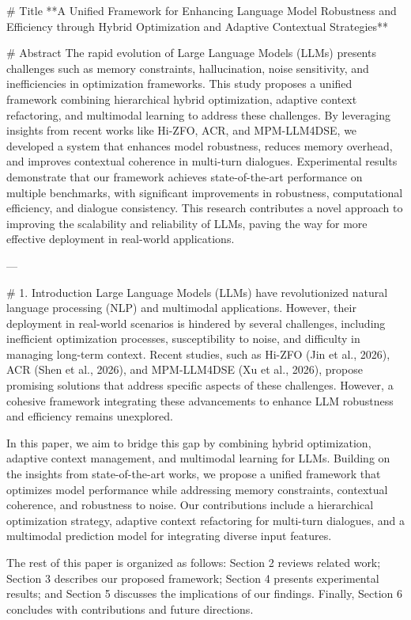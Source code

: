 # Title  
**A Unified Framework for Enhancing Language Model Robustness and Efficiency through Hybrid Optimization and Adaptive Contextual Strategies**

# Abstract  
The rapid evolution of Large Language Models (LLMs) presents challenges such as memory constraints, hallucination, noise sensitivity, and inefficiencies in optimization frameworks. This study proposes a unified framework combining hierarchical hybrid optimization, adaptive context refactoring, and multimodal learning to address these challenges. By leveraging insights from recent works like Hi-ZFO, ACR, and MPM-LLM4DSE, we developed a system that enhances model robustness, reduces memory overhead, and improves contextual coherence in multi-turn dialogues. Experimental results demonstrate that our framework achieves state-of-the-art performance on multiple benchmarks, with significant improvements in robustness, computational efficiency, and dialogue consistency. This research contributes a novel approach to improving the scalability and reliability of LLMs, paving the way for more effective deployment in real-world applications.

---

# 1. Introduction  
Large Language Models (LLMs) have revolutionized natural language processing (NLP) and multimodal applications. However, their deployment in real-world scenarios is hindered by several challenges, including inefficient optimization processes, susceptibility to noise, and difficulty in managing long-term context. Recent studies, such as Hi-ZFO (Jin et al., 2026), ACR (Shen et al., 2026), and MPM-LLM4DSE (Xu et al., 2026), propose promising solutions that address specific aspects of these challenges. However, a cohesive framework integrating these advancements to enhance LLM robustness and efficiency remains unexplored.

In this paper, we aim to bridge this gap by combining hybrid optimization, adaptive context management, and multimodal learning for LLMs. Building on the insights from state-of-the-art works, we propose a unified framework that optimizes model performance while addressing memory constraints, contextual coherence, and robustness to noise. Our contributions include a hierarchical optimization strategy, adaptive context refactoring for multi-turn dialogues, and a multimodal prediction model for integrating diverse input features.

The rest of this paper is organized as follows: Section 2 reviews related work; Section 3 describes our proposed framework; Section 4 presents experimental results; and Section 5 discusses the implications of our findings. Finally, Section 6 concludes with contributions and future directions.

